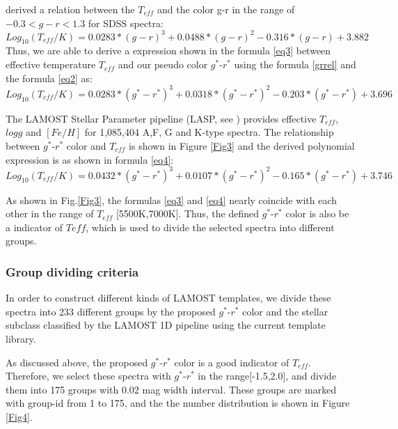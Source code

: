 \documentclass[manuscript]{aastex}
\begin{document}
\citet{ivezic2008milky} derived a relation between the $T_{eff}$ and the color g-r in the range of $-0.3 < g-r < 1.3$ for SDSS spectra:
\begin{equation}
 Log_{10} (T_{eff}/K)=0.0283* (g-r)^3 + 0.0488* (g-r)^2 - 0.316* (g-r) +3.882
 \label{grrel}
\end{equation}
Thus, we are able to derive a expression shown in the formula \ref{eq3} between effective temperature $T_{eff}$ and our pseudo color $g^*$-$r^*$ using the  formula \ref{grrel}  and the  formula \ref{eq2} as:
\begin{equation}
 Log_{10} (T_{eff}/K)=0.0283* (g^*-r^*)^3 + 0.0318* (g^*-r^*)^2 - 0.203* (g^*-r^*) +3.696
 \label{eq3}
\end{equation}

The LAMOST Stellar Parameter pipeline (LASP, see  \citet{wu2011automatic}) provides
effective $T_{eff}$, $log g$  and $[Fe/H]$ for 1,085,404  A,F, G and K-type spectra.
The relationship between $g^*$-$r^*$  color and $T_{eff}$ is shown in  Figure \ref{Fig3}
and the derived   polynomial expression is as shown in formula \ref{eq4}:
\begin{equation}
Log_{10} (T_{eff}/K)=0.0432* (g^*-r^*)^3 +0.0107* (g^*-r^*)^2 -0.165* (g^*-r^*) +3.746
\label{eq4}
\end{equation}

As shown in Fig.\ref{Fig3}, the formulas \ref{eq3} and \ref{eq4}  nearly  coincide with each other in the range of $T_{eff}$ [5500K,7000K].
Thus, the defined $g^*$-$r^*$ color is also be a indicator of $Teff$,
which is used to divide the selected spectra into different groups.



\subsubsection{Group dividing criteria}

In order to construct different kinds of LAMOST templates, we divide these spectra into 233 different groups by the proposed $g^*$-$r^*$ color and the stellar subclass classified by the LAMOST 1D pipeline using the current template library.

As discussed above, the proposed $g^*$-$r^*$ color is a good indicator of $T_{eff}$.
Therefore, we select these spectra with $g^*$-$r^*$ in  the range[-1.5,2.0], and divide them into 175 groups with 0.02 mag width interval.
These groups are marked with group-id from 1 to 175,
and the the number distribution is shown in Figure \ref{Fig4}.
\end{document}

